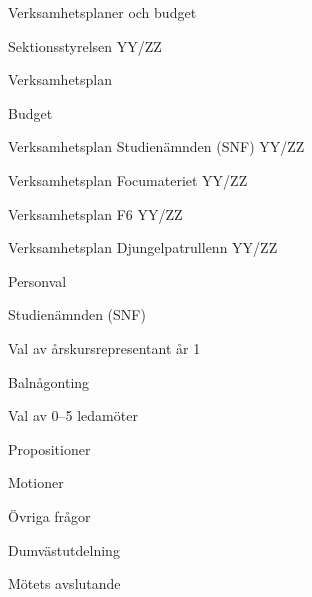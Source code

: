 \documentclass[prelim]{sektionsmote}
\begin{document}
\begin{ootd}
\item{Verksamhetsplaner och budget}
\begin{ootd}
    \item Sektionsstyrelsen YY/ZZ
    \begin{ootd}
        \item Verksamhetsplan
        \item Budget
    \end{ootd}
    \item Verksamhetsplan Studienämnden (SNF) YY/ZZ
    \item Verksamhetsplan Focumateriet YY/ZZ
    \item Verksamhetsplan F6 YY/ZZ
    \item Verksamhetsplan Djungelpatrullenn YY/ZZ
\end{ootd}


\item{Personval}
\begin{ootd}
\item Studienämnden (SNF)
    \begin{ootd}
        \item Val av årskursrepresentant år 1
    \end{ootd}
    \item Balnågonting
    \begin{ootd}
        \item Val av 0--5 ledamöter
    \end{ootd}
\end{ootd}

\item{Propositioner}

\item{Motioner}

\item{Övriga frågor}

\item{Dumvästutdelning}

\item{Mötets avslutande}
\end{ootd}
\end{document}

